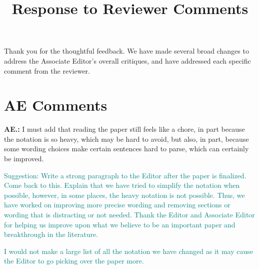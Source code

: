 \documentclass[letterpaper, parskip]{scrartcl}
\newcommand{\pointRaised}[2]{%
	\textbf{#1.\theresponsectr:} #2
}
\newcounter{responsectr}[section]     %
\begin{document}

	\title{Response to Reviewer Comments}
	\maketitle
	
Thank you for the thoughtful feedback. We have made several broad changes to address the Associate Editor's overall critiques, and have addressed each specific comment from the reviewer.

\section{AE Comments}

\pointRaised{AE}{I must add that reading the paper still feels like a chore, in part because the notation is so heavy, which may be hard to avoid, but also, in part, because some wording choices make certain sentences hard to parse, which can certainly be improved.}

\textcolor{teal}{Suggestion: Write a strong paragraph to the Editor after the paper is finalized. Come back to this. Explain that we have tried to simplify the notation when possible, however, in some places, the heavy notation is not possible. Thus, we have worked on improving more precise wording and removing sections or wording that is distracting or not needed. Thank the Editor and Associate Editor for helping us improve upon what we believe to be an important paper and breakthrough in the literature.} 

\textcolor{teal}{I would not make a large list of all the notation we have changed as it may cause the Editor to go picking over the paper more.}
\end{document}
